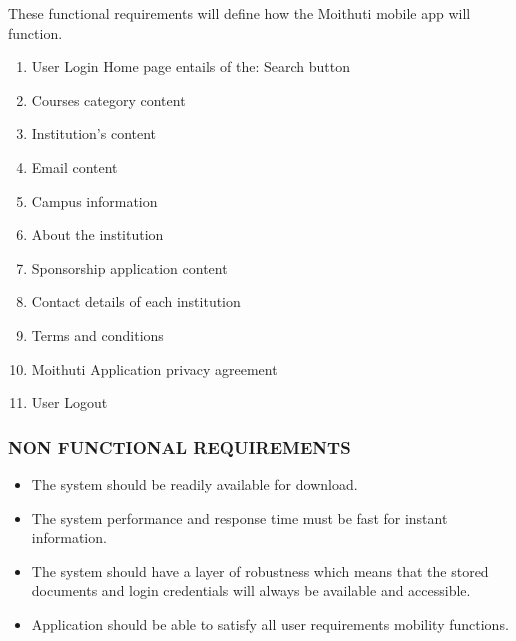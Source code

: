 These functional requirements will define how the Moithuti mobile app will function.

\begin{enumerate}
	\item User Login
	Home page entails of the:
	Search button
	\item Courses category content
	\item Institution’s content
	\item Email content
	\item Campus information
	\item About the institution
	\item Sponsorship application content
	\item Contact details of each institution
	\item Terms and conditions
	\item Moithuti Application privacy agreement
	\item User Logout
\end{enumerate}

\subsubsection{NON FUNCTIONAL REQUIREMENTS}
\begin{itemize}
	\item The system should be readily available for download.
	\item The system performance and response time must be fast for instant information.
	\item The system should have a layer of robustness which means that the stored documents and login credentials will always be available and accessible.
	\item Application should be able to satisfy all user requirements mobility functions.
	
\end{itemize}

